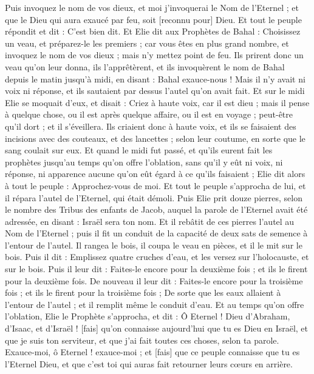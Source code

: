 \begin{multicols}{2}
Puis invoquez le nom de vos dieux, et moi j'invoquerai le Nom de l'Eternel ; et que le Dieu qui aura exaucé par feu, soit [reconnu pour] Dieu. Et tout le peuple répondit et dit : C'est bien dit.
Et Elie dit aux Prophètes de Bahal : Choisissez un veau, et préparez-le les premiers ; car vous êtes en plus grand nombre, et invoquez le nom de vos dieux ; mais n'y mettez point de feu.
Ils prirent donc un veau qu'on leur donna, ils l'apprêtèrent, et ils invoquèrent le nom de Bahal depuis le matin jusqu'à midi, en disant : Bahal exauce-nous ! Mais il n'y avait ni voix ni réponse, et ils sautaient par dessus l'autel qu'on avait fait.
Et sur le midi Elie se moquait d'eux, et disait : Criez à haute voix, car il est dieu ; mais il pense à quelque chose, ou il est après quelque affaire, ou il est en voyage ; peut-être qu'il dort ; et il s'éveillera.
Ils criaient donc à haute voix, et ils se faisaient des incisions avec des couteaux, et des lancettes ; selon leur coutume, en sorte que le sang coulait sur eux.
Et quand le midi fut passé, et qu'ils eurent fait les prophètes jusqu'au temps qu'on offre l'oblation, sans qu'il y eût ni voix, ni réponse, ni apparence aucune qu'on eût égard à ce qu'ils faisaient ;
Elie dit alors à tout le peuple : Approchez-vous de moi. Et tout le peuple s'approcha de lui, et il répara l'autel de l'Eternel, qui était démoli.
Puis Elie prit douze pierres, selon le nombre des Tribus des enfants de Jacob, auquel la parole de l'Eternel avait été adressée, en disant : Israël sera ton nom.
Et il rebâtit de ces pierres l'autel au Nom de l'Eternel ; puis il fit un conduit de la capacité de deux sats de semence à l'entour de l'autel.
Il rangea le bois, il coupa le veau en pièces, et il le mit sur le bois.
Puis il dit : Emplissez quatre cruches d'eau, et les versez sur l'holocauste, et sur le bois. Puis il leur dit : Faites-le encore pour la deuxième fois ; et ils le firent pour la deuxième fois. De nouveau il leur dit : Faites-le encore pour la troisième fois ; et ils le firent pour la troisième fois ;
De sorte que les eaux allaient à l'entour de l'autel ; et il remplit même le conduit d'eau.
Et au temps qu'on offre l'oblation, Elie le Prophète s'approcha, et dit : Ô Eternel ! Dieu d'Abraham, d'Isaac, et d'Israël ! [fais] qu'on connaisse aujourd'hui que tu es Dieu en Israël, et que je suis ton serviteur, et que j'ai fait toutes ces choses, selon ta parole.
Exauce-moi, ô Eternel ! exauce-moi ; et [fais] que ce peuple connaisse que tu es l'Eternel Dieu, et que c'est toi qui auras fait retourner leurs cœurs en arrière.

\end{multicols}

